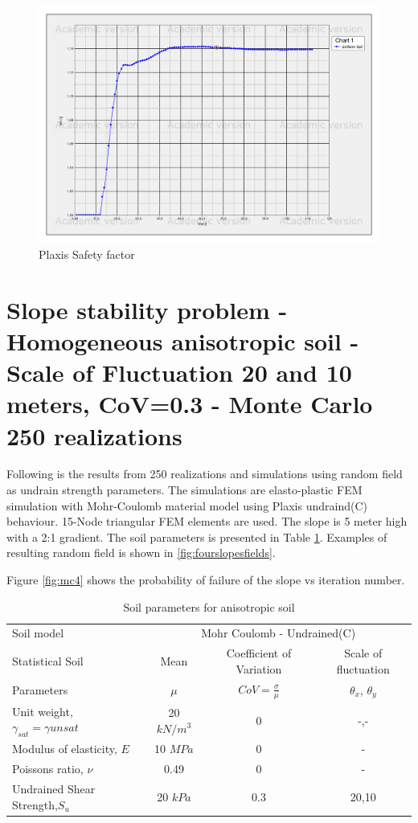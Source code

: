 \begin{figure}[h]
	\includegraphics[width=\textwidth]{fig/Chart1}
	\caption{Plaxis Safety factor}
	\label{fig:psf1}
\end{figure}



\section{Slope stability problem - Homogeneous anisotropic soil - Scale of Fluctuation 20 and 10 meters, CoV=0.3 - Monte Carlo 250 realizations}


Following is the results from 250 realizations and simulations using random field as undrain strength parameters. The simulations are elasto-plastic FEM simulation with Mohr-Coulomb material model using Plaxis undraind(C) behaviour. 15-Node triangular FEM elements are used. The slope is 5 meter high with a 2:1 gradient.
The soil parameters is presented in Table \ref{tab2}. 
Examples of resulting random field is shown in \ref{fig:fourslopesfields}. 

Figure \ref{fig:mc4} shows the probability of failure of the slope vs iteration number. 

\begin{table}[h]
	\centering\small
	\caption{Soil parameters for anisotropic soil}
	\label{tab2}
		\begin{tabular*}{\textwidth}{@{\extracolsep{\fill}}lccc}
			\toprule
			 Soil model  &\multicolumn{3}{c}{Mohr Coulomb - Undrained(C)}\\
  \cmidrule{2-4}
			Statistical Soil	& Mean		 	& Coefficient of Variation 		& Scale of fluctuation \\
			Parameters	  	& $\mu$ 		&  $CoV = \frac{\sigma}{\mu}$ 		& $\theta_x$, $\theta_y$ \\
        
			\midrule
			  Unit weight, $\gamma_{sat}=\gamma{unsat}$ & 20 $kN/m^3$ & 0 & -,- \\
		          Modulus of elasticity, $E$ & 10 $MPa$ & 0 & - \\
		          Poissons ratio, $\nu$ & 0.49 & 0 & - \\
		          Undrained Shear Strength,$S_u$ & 20 $kPa$ & 0.3 & 20,10 \\
			\bottomrule
		\end{tabular*}
\end{table}


